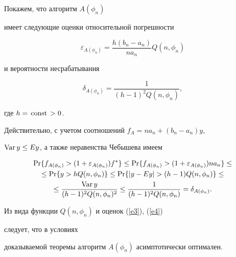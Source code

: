 \begin{pf}


Покажем, что алгоритм $A(\phi_n)$


имеет следующие оценки относительной погрешности


\begin{equation}


\label {e3}


\varepsilon_{A(\phi_n)} = 


\frac{h(b_n-a_n)}{na_n} Q(n,\phi_n)


\end{equation}


и вероятности несрабатывания


\begin{equation}


\label {e4}


\delta_{A(\phi_n)} = \frac{1}{(h-1)^2 Q(n,\phi_n)},


\end{equation}


где $h =\text{\,const\,} > 0$.





Действительно, с учетом соотношений $ f_A = na_n + (b_n-a_n)y$, 


$\text{Var\,} y \le E y$, а также неравенства Чебышева имеем


\begin{multline*}


\PR\{f_{A(\phi_n)} > (1 + \varepsilon_{A(\phi_n)})f^*\} 


\leq \PR\{f_{A(\phi_n)} > (1 + \varepsilon_{A(\phi_n)})na_n\}\le \\


%


\leq \PR\{y> h Q(n,\phi_n) \} \leq 


\PR\{|y-Ey|> (h-1) Q(n,\phi_n) \} \le \\


%


\leq \frac{\text{Var\,} y}{ (h-1)^2 Q(n,\phi_n)^2} \leq


\frac{1}{ (h-1)^2 Q(n,\phi_n)} = \delta_{A(\phi_n)}.


\end{multline*}


Из вида функции $Q(n,\phi_n)$ и оценок (\ref{e3}), (\ref{e4}) 


следует, что в условиях


доказываемой теоремы алгоритм $A(\phi_n)$ асимптотически оптимален.


\end{pf}






